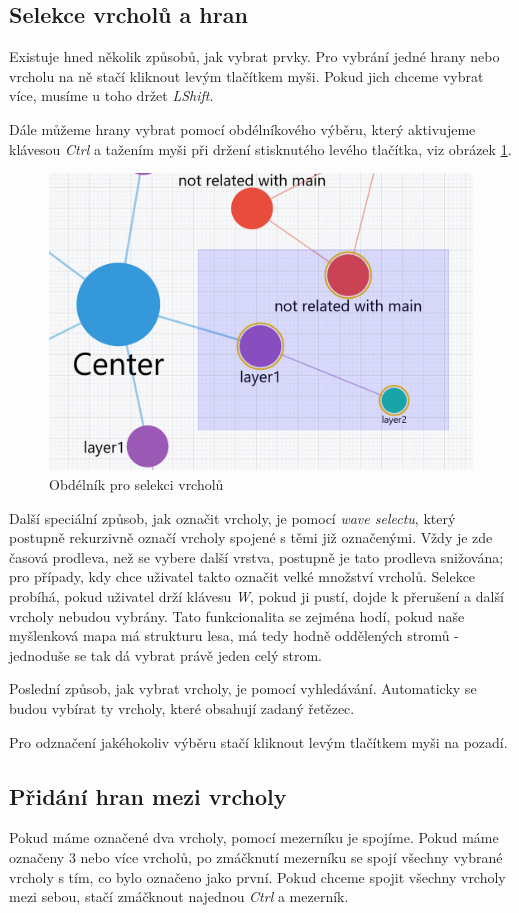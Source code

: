 \subsection{Selekce vrcholů a hran}
Existuje hned několik způsobů, jak vybrat prvky. Pro vybrání jedné hrany nebo vrcholu na ně stačí kliknout levým tlačítkem myši. Pokud jich chceme vybrat více, musíme u toho držet \textit{LShift}.
\par
Dále můžeme hrany vybrat pomocí obdélníkového výběru, který aktivujeme klávesou \textit{Ctrl} a tažením myši při držení stisknutého levého tlačítka, viz obrázek \ref{fig:select}.
\begin{figure}[h]
    \centering
    \includegraphics[width=0.5\linewidth]{Images/select.png}
    \caption{Obdélník pro selekci vrcholů}
    \label{fig:select}
\end{figure}
\par
Další speciální způsob, jak označit vrcholy, je pomocí \textit{wave selectu}, který postupně rekurzivně označí vrcholy spojené s těmi již označenými. Vždy je zde časová prodleva, než se vybere další vrstva, postupně je tato prodleva snižována; pro případy, kdy chce uživatel takto označit velké množství vrcholů. Selekce probíhá, pokud uživatel drží klávesu \textit{W}, pokud ji pustí, dojde k přerušení a další vrcholy nebudou vybrány. Tato funkcionalita se zejména hodí, pokud naše myšlenková mapa má strukturu lesa, má tedy hodně oddělených stromů - jednoduše se tak dá vybrat právě jeden celý strom.
\par
Poslední způsob, jak vybrat vrcholy, je pomocí vyhledávání. Automaticky se budou vybírat ty vrcholy, které obsahují zadaný řetězec.
\par
Pro odznačení jakéhokoliv výběru stačí kliknout levým tlačítkem myši na pozadí.
\newpage
\subsection{Přidání hran mezi vrcholy}
Pokud máme označené dva vrcholy, pomocí mezerníku je spojíme. Pokud máme označeny 3 nebo více vrcholů, po zmáčknutí mezerníku se spojí všechny vybrané vrcholy s tím, co bylo označeno jako první. Pokud chceme spojit všechny vrcholy mezi sebou, stačí zmáčknout najednou \textit{Ctrl} a mezerník.

